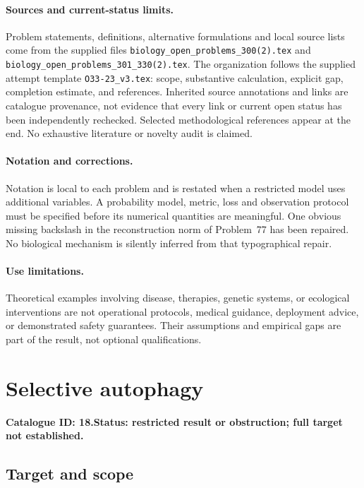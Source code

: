 \documentclass[11pt]{article}
\begin{document}
\paragraph{Sources and current-status limits.}
Problem statements, definitions, alternative formulations and local source lists
come from the supplied files
\texttt{biology\_open\_problems\_300(2).tex} and
\texttt{biology\_open\_problems\_301\_330(2).tex}.
The organization follows the supplied attempt template
\texttt{O33-23\_v3.tex}: scope, substantive calculation, explicit gap,
completion estimate, and references. Inherited source annotations and links are
catalogue provenance, not evidence that every link or current open status has
been independently rechecked. Selected methodological references appear at the
end. No exhaustive literature or novelty audit is claimed.

\paragraph{Notation and corrections.}
Notation is local to each problem and is restated when a restricted model uses
additional variables. A probability model, metric, loss and observation protocol
must be specified before its numerical quantities are meaningful. One obvious
missing backslash in the reconstruction norm of Problem~77 has been repaired.
No biological mechanism is silently inferred from that typographical repair.

\paragraph{Use limitations.}
Theoretical examples involving disease, therapies, genetic systems, or ecological
interventions are not operational protocols, medical guidance, deployment advice,
or demonstrated safety guarantees. Their assumptions and empirical gaps are part
of the result, not optional qualifications.

\setcounter{section}{17}
\section{Selective autophagy}
\label{prob:018}
\noindent\textbf{Catalogue ID: 18.}\quad \textbf{Status: restricted result or obstruction; full target not established.}
\subsection{Target and scope}
\end{document}
